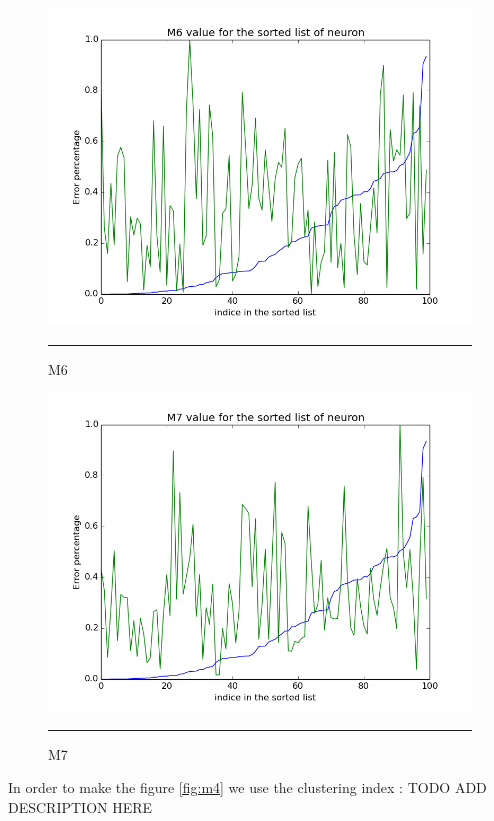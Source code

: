 \begin{figure}[htbp]
    \centering
    \includegraphics[scale=0.5]{Figures/m6.png}
    \rule{35em}{0.5pt}
    \caption[M6]{M6}
    \label{fig:m6}
\end{figure}


\begin{figure}[htbp]
    \centering
    \includegraphics[scale=0.5]{Figures/m7.png}
    \rule{35em}{0.5pt}
    \caption[M7]{M7}
    \label{fig:m7}
\end{figure}


In order to make the figure \ref{fig:m4} we use the clustering index  : TODO ADD DESCRIPTION HERE


